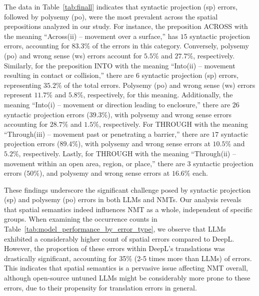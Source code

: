 The data in Table~\ref{tab:finall} indicates that syntactic projection (sp) errors, followed by polysemy (po), were the most prevalent across the spatial prepositions analyzed in our study. For instance, the preposition ACROSS with the meaning ``Across(ii) -- movement over a surface,'' has $15$ syntactic projection errors, accounting for $83.3\%$ of the errors in this category. Conversely, polysemy (po) and wrong sense (ws) errors account for $5.5\%$ and $27.7\%$, respectively. Similarly, for the preposition INTO with the meaning ``Into(ii) -- movement resulting in contact or collision,'' there are $6$ syntactic projection (sp) errors, representing $35.2\%$ of the total errors. Polysemy (po) and wrong sense (ws) errors represent $11.7\%$ and $5.8\%$, respectively, for this meaning. Additionally, the meaning ``Into(i) -- movement or direction leading to enclosure,'' there are $26$ syntactic projection errors ($39.3\%$), with polysemy and wrong sense errors accounting for $28.7\%$ and $1.5\%$, respectively. For THROUGH with the meaning ``Through(iii) -- movement past or penetrating a barrier,'' there are $17$ syntactic projection errors ($89.4\%$), with polysemy and wrong sense errors at $10.5\%$ and $5.2\%$, respectively. Lastly, for THROUGH with the meaning ``Through(ii) -- movement within an open area, region, or place,'' there are $3$ syntactic projection errors ($50\%$), and polysemy and wrong sense errors at $16.6\%$ each.

These findings underscore the significant challenge posed by syntactic projection (sp) and polysemy (po) errors in both LLMs and NMTs. Our analysis reveals that spatial semantics indeed influences NMT as a whole, independent of specific groups. When examining the occurrence counts in Table~\ref{tab:model_performance_by_error_type}, we observe that LLMs exhibited a considerably higher count of spatial errors compared to DeepL. However, the proportion of these errors within DeepL's translations was drastically significant, accounting for 35\% (2-5 times more than LLMs) of errors. This indicates that spatial semantics is a pervasive issue affecting NMT overall, although open-source untuned LLMs might be considerably more prone to these errors, due to their propensity for translation errors in general.


